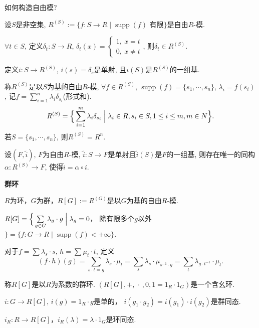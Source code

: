 	如何构造自由模?\par
	\begin{proposition}
		设$S$是非空集, $R^{(S)}:=\{f: S\rightarrow R\mid 
        \operatorname{supp}(f)\text{ 有限}\}$是自由$R$-模.\par
		$\forall t\in S$, 定义$\delta_t:S\rightarrow R$, 
        $\delta_t(x)=\begin{cases} 1,\ x=t\\ 0,\ x\neq t\end{cases}$, 
        则$\delta_t\in R^{(S)}$.\par
		定义$i:S\rightarrow R^{(S)}$, $i(s)=\delta_s$是单射, 
        且$i(S)$是$R^{(S)}$的一组基.
	\end{proposition}
	
	\begin{definition}
		称$R^{(S)}$是以$S$为基的自由$R$-模, $\forall f\in R^{(S)}$, 
        $\operatorname{supp}(f)=\{s_1,\cdots,s_n\}$, $\lambda_i=f(s_i)$, 
        记$f=\sum\limits_{i=1}^{n} \lambda_i \delta_{s_i}$(形式和).
		$$R^{(S)}=\Big\{\sum\limits_{i=1}^m \lambda_i\delta_{s_i}\Bigm| \lambda_i\in R, s_i\in S, 1\leq i\leq m, m\in N\Big\}.$$
        若$S=\{s_1,\cdots,s_n\}$, 则$R^{(S)}=R^n$.
	\end{definition}
	
	\begin{proposition}
		设$(F,\tilde{i})$, $F$为自由$R$-模, 
        $\tilde{i}:S\rightarrow F$是单射且$\tilde{i}(S)$是$F$的一组基, 
        则存在唯一的同构$\alpha: R^{(S)}\rightarrow F$, 
        使得$\tilde{i}=\alpha \circ i$.
	\end{proposition}
	
	\begin{example} \textbf{群环}\par
	$R$为环，$G$为群，$R[G]:=R^{(G)}$是以$G$为基的自由$R$-模.\par
	$R[G]=\Big\{\sum\limits_{g\in G} \lambda_g \cdot g\Bigm| \lambda_g=0$，
    除有限多个$g$以外$\Big\}
    =\{f:G\rightarrow R\mid \operatorname{supp}(f)<+\infty\}$.\par
	对于$f=\sum \lambda_s\cdot s$, $h=\sum \mu_t\cdot t$, 定义
    $$(f\cdot h)(g)=\sum\limits_{s\cdot t=g} \lambda_s\cdot \mu_t 
    =\sum\limits_{s} \lambda_s\cdot \mu_{s^{-1}\cdot g}
    =\sum\limits_{t} \lambda_{g\cdot t^{-1}}\cdot \mu_t.$$
	
	称$R[G]$是以$R$为系数的群环. $(R[G],+,\,\cdot\,,0,1=1_R\cdot 1_G)$是一个含幺环.\par
	$i:G\rightarrow R[G]$, $i(g)=1_R\cdot g$是单的， 
    $i(g_1\cdot g_2)=i(g_1)\cdot i(g_2)$是群同态.\par
	$i_R:R\rightarrow R[G]$，$i_R(\lambda)=\lambda \cdot 1_G$是环同态.
	\end{example}
	
